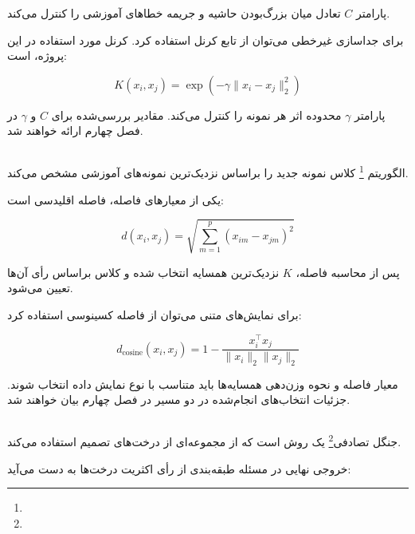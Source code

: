 \documentclass[12pt,a4paper,oneside]{report}
\begin{document}
پارامتر $C$ تعادل میان بزرگ‌بودن حاشیه و جریمه خطاهای آموزشی را کنترل می‌کند.

برای جداسازی غیرخطی می‌توان از تابع کرنل استفاده کرد. کرنل مورد استفاده در این پروژه،
است:

\begin{equation}
K(x_i,x_j)
=
\exp
\left(
-\gamma
\|x_i-x_j\|_2^2
\right)
\end{equation}

پارامتر $\gamma$ محدوده اثر هر نمونه را کنترل می‌کند. مقادیر بررسی‌شده برای $C$ و $\gamma$ در فصل چهارم ارائه خواهند شد.


\subsection{}

الگوریتم
\footnote{}
کلاس نمونه جدید را براساس نزدیک‌ترین نمونه‌های آموزشی مشخص می‌کند.

یکی از معیارهای فاصله، فاصله اقلیدسی است:

\begin{equation}
d(x_i,x_j)
=
\sqrt{
\sum_{m=1}^{p}
(x_{im}-x_{jm})^2
}
\end{equation}

پس از محاسبه فاصله، $K$ نزدیک‌ترین همسایه انتخاب شده و کلاس براساس رأی آن‌ها تعیین می‌شود.

برای نمایش‌های متنی می‌توان از فاصله کسینوسی استفاده کرد:

\begin{equation}
d_{\mathrm{cosine}}(x_i,x_j)
=
1-
\frac{x_i^\top x_j}{\|x_i\|_2\|x_j\|_2}
\end{equation}

معیار فاصله و نحوه وزن‌دهی همسایه‌ها باید متناسب با نوع نمایش داده انتخاب شوند. جزئیات انتخاب‌های انجام‌شده در دو مسیر در فصل چهارم بیان خواهند شد.


\subsection{}

جنگل تصادفی\footnote{} یک روش
است که از مجموعه‌ای از درخت‌های تصمیم استفاده می‌کند.

خروجی نهایی در مسئله طبقه‌بندی از رأی اکثریت درخت‌ها به دست می‌آید:
\end{document}
